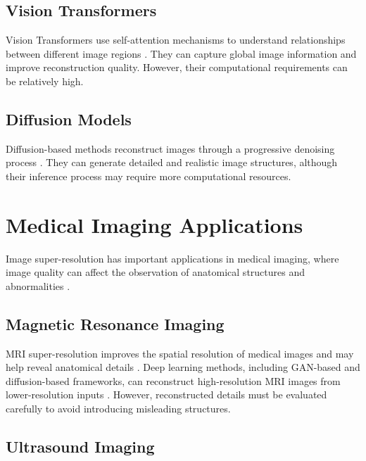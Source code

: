 \documentclass[conference]{IEEEtran}
\begin{document}
\subsection{Vision Transformers}

Vision Transformers use self-attention mechanisms to understand relationships between different image regions \cite{liang2021swinir, chen2023hat}. They can capture global image information and improve reconstruction quality. However, their computational requirements can be relatively high.

\subsection{Diffusion Models}

Diffusion-based methods reconstruct images through a progressive denoising process \cite{li2022srdiff, yue2023resshift, aala2026diffusion}. They can generate detailed and realistic image structures, although their inference process may require more computational resources.

\section{Medical Imaging Applications}

Image super-resolution has important applications in medical imaging, where image quality can affect the observation of anatomical structures and abnormalities \cite{ahmad2022multipath, gurappa2026medsrvision}.

\subsection{Magnetic Resonance Imaging}

MRI super-resolution improves the spatial resolution of medical images and may help reveal anatomical details \cite{zhu2019lfsr, viswapriya2026gcrgan, mohsen2026dsrgan}. Deep learning methods, including GAN-based and diffusion-based frameworks, can reconstruct high-resolution MRI images from lower-resolution inputs \cite{zhao2025pdm, poudel2025srmri, safari2025mridiffusion}. However, reconstructed details must be evaluated carefully to avoid introducing misleading structures.

\subsection{Ultrasound Imaging}
\end{document}
